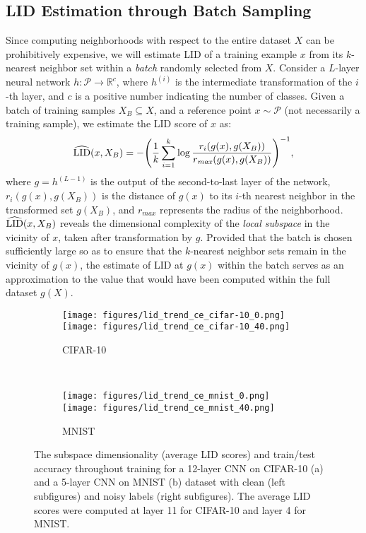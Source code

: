 \documentclass{article}
\begin{document}
\subsection{LID Estimation through Batch Sampling}\label{sec:lid_dnn}
Since computing neighborhoods with respect to the entire dataset $X$ can be prohibitively expensive, we will estimate LID of a training example $x$ from its $k$-nearest neighbor set within a \textit{batch} randomly selected from $X$.   
Consider a $L$-layer neural network $h:\mathcal{P} \rightarrow \mathbb{R}^c $, where $h^{(i)}$ is the intermediate transformation of the $i$-th layer, and $c$ is a positive number indicating the number of classes. Given a batch of training samples $X_{B}\subseteq X$, and a reference point $x \sim \mathcal{P}$ (not necessarily a training sample), we estimate the LID score of $x$ as:
\begin{equation} \label{eq:lid_training}
    \widehat{\textup{LID}}(x, X_B) = - \Bigg( \frac{1}{k}\sum_{i=1}^{k}\log \frac{r_i(g(x), g(X_{B}))}{r_{\mathit{max}}(g(x), g(X_{B}))}\Bigg)^{-1},
\end{equation}
where $g = h^{(L-1)}$ is the output of the second-to-last layer of the network, $r_i(g(x), g(X_{B}))$ is the distance of $g(x)$ to its $i$-th nearest neighbor in the transformed set $g(X_{B})$, and $r_{\mathit{max}}$ represents the radius of the neighborhood. $\widehat{\textup{LID}}(x, X_B)$ reveals the dimensional complexity of the {\em local subspace} in the vicinity of $x$, taken after transformation by $g$. Provided that the batch is chosen sufficiently large so as to ensure that the $k$-nearest neighbor sets remain in the vicinity of $g(x)$, the estimate of LID at $g(x)$ within the batch serves as an approximation to the value that would have been computed within the full dataset $g(X)$. 







\begin{figure}[!t]
\centering
\begin{subfigure}{.5\textwidth}
  \centering
  \texttt{[image: figures/lid\_trend\_ce\_cifar-10\_0.png]}
\texttt{[image: figures/lid\_trend\_ce\_cifar-10\_40.png]}
  \caption{CIFAR-10}
  \label{fig:lid_cifar}
\end{subfigure} \\
\begin{subfigure}{.5\textwidth}
  \centering
  \texttt{[image: figures/lid\_trend\_ce\_mnist\_0.png]}
\texttt{[image: figures/lid\_trend\_ce\_mnist\_40.png]}
  \caption{MNIST}
  \label{fig:lid_mnist}
\end{subfigure}
\caption{The subspace dimensionality (average LID scores) and train/test accuracy throughout training for a 12-layer CNN on CIFAR-10 (a) and a 5-layer CNN on MNIST (b) dataset with clean (left subfigures) and noisy labels (right subfigures). The average LID scores were computed at layer 11 for CIFAR-10 and layer 4 for MNIST.}
\label{fig:lid_trends}
\vspace{-0.2in}
\end{figure}
\end{document}
